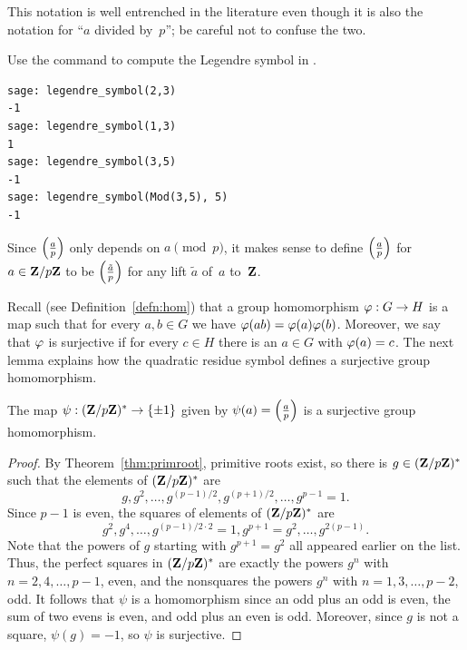 This notation is well entrenched in the literature even though it
is also the notation for ``$a$ divided by~$p$''; be careful
not to confuse the two.

\begin{sg}
Use the  command to
compute the Legendre symbol in \sage.
\begin{verbatim}
sage: legendre_symbol(2,3)
-1
sage: legendre_symbol(1,3)
1
sage: legendre_symbol(3,5)
-1
sage: legendre_symbol(Mod(3,5), 5)
-1
\end{verbatim}
\end{sg}

Since $\left(\frac{a}{p}\right)$ only depends on $a\pmod{p}$, it makes sense
to define $\left(\frac{a}{p}\right)$ for $a\in \mathbf{Z}/p\mathbf{Z}{}$ to be $\left(\frac{\tilde{a}}{p}\right)$ for
any lift $\tilde{a}$ of~$a$ to~$\mathbf{Z}$.

Recall (see Definition~\ref{defn:hom}) that a group
homomorphism $\varphi:G \to H$ is a map such that for every
$a,b\in G$ we have $\varphi(ab) = \varphi(a)\varphi(b)$.
Moreover, we say that $\varphi$ is surjective if for every
$c\in H$ there is an $a\in G$ with $\varphi(a) = c$.
The next lemma explains how the quadratic
residue symbol defines a surjective group homomorphism.

\begin{lemma}\label{lem:qrhom}
  The map $\psi:(\mathbf{Z}/p\mathbf{Z}{})^*\to \{\pm 1\}$ given by
$\psi(a) = \left(\frac{a}{p}\right)$ is a surjective group homomorphism.
\end{lemma}
\begin{proof}
  By Theorem~\ref{thm:primroot}, primitive roots exist, so
there is $g\in (\mathbf{Z}/p\mathbf{Z}{})^*$ such that the elements of $(\mathbf{Z}/p\mathbf{Z}{})^*$ are
$$
  g, g^2, \ldots, g^{(p-1)/2}, g^{(p+1)/2}, \ldots, g^{p-1}=1.
$$
Since $p-1$ is even, the squares of elements of $(\mathbf{Z}/p\mathbf{Z}{})^*$ are
$$
  g^2, g^4, \ldots, g^{(p-1)/2 \cdot 2}=1, g^{p+1}=g^2,\ldots, g^{2(p-1)}.
$$
Note that the powers of $g$ starting with $g^{p+1}=g^2$ all appeared
earlier on the list.  Thus, the perfect squares in $(\mathbf{Z}/p\mathbf{Z}{})^*$ are
exactly the powers $g^n$ with $n=2,4,\ldots,p-1$, even, and the
nonsquares the powers $g^n$ with $n=1,3,\ldots,p-2$, odd.  It follows
that $\psi$ is a homomorphism since an odd plus an odd is even, the
sum of two evens is even, and odd plus an even is odd. Moreover,
since $g$ is not a square, $\psi(g)=-1$, so $\psi$ is surjective.

\end{proof}

